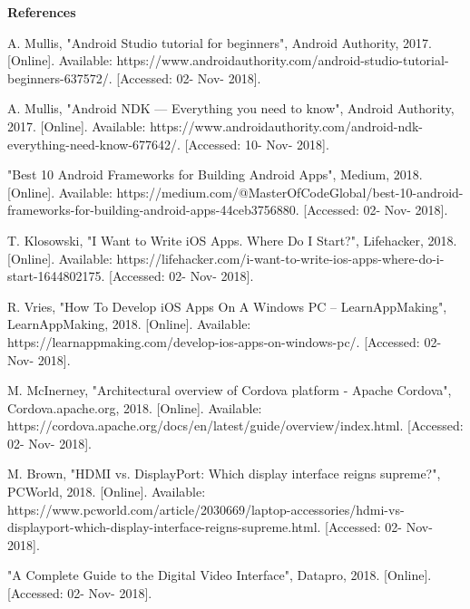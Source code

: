 \documentclass[letterpaper,10pt,draftclsnofoot,onecolumn,]{IEEEtran}
\begin{document}
\newpage
\begin{center}
\textbf{References}
\end{center}
\par
[1]A. Mullis, "Android Studio tutorial for beginners", Android Authority, 2017. [Online]. Available: https://www.androidauthority.com/android-studio-tutorial-beginners-637572/. [Accessed: 02- Nov- 2018].
\par
[2]A. Mullis, "Android NDK — Everything you need to know", Android Authority, 2017. [Online]. Available: https://www.androidauthority.com/android-ndk-everything-need-know-677642/. [Accessed: 10- Nov- 2018].
\par
[3]"Best 10 Android Frameworks for Building Android Apps", Medium, 2018. [Online]. Available: https://medium.com/@MasterOfCodeGlobal/best-10-android-frameworks-for-building-android-apps-44ceb3756880. [Accessed: 02- Nov- 2018].
\par
[4]T. Klosowski, "I Want to Write iOS Apps. Where Do I Start?", Lifehacker, 2018. [Online]. Available: https://lifehacker.com/i-want-to-write-ios-apps-where-do-i-start-1644802175. [Accessed: 02- Nov- 2018].
\par
[5]R. Vries, "How To Develop iOS Apps On A Windows PC – LearnAppMaking", LearnAppMaking, 2018. [Online]. Available: https://learnappmaking.com/develop-ios-apps-on-windows-pc/. [Accessed: 02- Nov- 2018].
\par
[6]M. McInerney, "Architectural overview of Cordova platform - Apache Cordova", Cordova.apache.org, 2018. [Online]. Available: https://cordova.apache.org/docs/en/latest/guide/overview/index.html. [Accessed: 02- Nov- 2018].
\par
[7] M. Brown, "HDMI vs. DisplayPort: Which display interface reigns supreme?", PCWorld, 2018. [Online]. Available: https://www.pcworld.com/article/2030669/laptop-accessories/hdmi-vs-displayport-which-display-interface-reigns-supreme.html. [Accessed: 02- Nov- 2018].
\par
[8] "A Complete Guide to the Digital Video Interface", Datapro, 2018. [Online]. [Accessed: 02- Nov- 2018].
\end{document}
